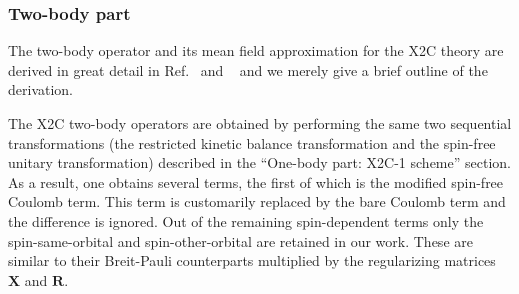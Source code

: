 \documentclass[10pt,aps,prb,twocolumn,amsmath,amssymb,superscriptaddress]{revtex4-1}
\renewcommand\b[1]{\ensuremath{\mathbf{#1}}}
\begin{document}


\subsubsection{Two-body part}
The two-body operator and its mean field approximation for the X2C theory are derived in great detail in Ref.~ and ~ and we merely give a brief outline of the derivation.

The X2C two-body operators are obtained by performing the same two sequential transformations (the restricted kinetic balance transformation and the spin-free unitary transformation) described in the ``One-body part: X2C-1 scheme'' section.
As a result, one obtains several terms, the first of which is the modified spin-free Coulomb term. This term is customarily replaced by the bare Coulomb term and the difference is ignored. Out of the remaining spin-dependent terms only the spin-same-orbital and spin-other-orbital are retained in our work. These are similar to their Breit-Pauli counterparts multiplied by the regularizing matrices $\b{X}$ and $\b{R}$.
\end{document}
